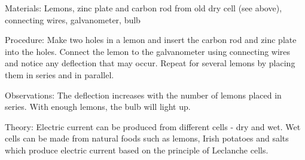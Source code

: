 \begin{multicols}{2}
\begin{description*}
\item[Materials:]{Lemons, zinc plate and carbon rod from old dry cell (see above), connecting wires, galvanometer, bulb}
\item[Procedure:]{Make two holes in a lemon and insert the carbon rod and zinc plate into the holes. Connect the lemon to the galvanometer using connecting wires and notice any deflection that may occur. Repeat for several lemons by placing them in series and in parallel.}
\item[Observations:]{The deflection increases with the number of lemons placed in series. With enough lemons, the bulb will light up.}
\item[Theory:]{Electric current can be produced from different cells - dry and wet. Wet cells can be made from natural foods such as lemons, Irish potatoes and salts which produce electric current based on the principle of Leclanche cells.}
\end{description*}






\end{multicols}

\pagebreak